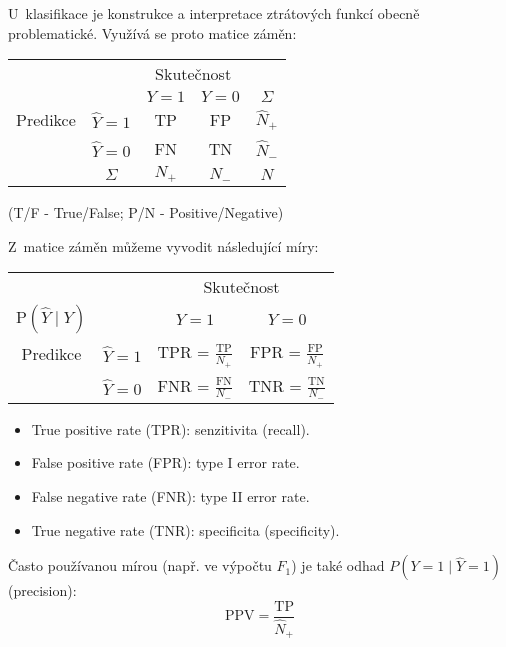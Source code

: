 U~klasifikace je konstrukce a interpretace ztrátových funkcí obecně problematické. Využívá se proto matice záměn:
{\def\arraystretch{1.5}
\begin{center}
    \begin{tabular}{ c c | c c | c }
                 &               & \multicolumn{2}{c|}{Skutečnost}                       \\
                 &               & $Y = 1$                         & $Y=0$ & $\Sigma$    \\
        \hline
        Predikce & $\hat{Y} = 1$ & TP                              & FP    & $\hat{N}_+$ \\
                 & $\hat{Y} = 0$ & FN                              & TN    & $\hat{N}_-$ \\
        \hline
                 & $\Sigma$      & $N_+$                           & $N_-$ & $N$
    \end{tabular}
\end{center}}
(T/F - True/False; P/N - Positive/Negative)

Z~matice záměn můžeme vyvodit následující míry:
{\def\arraystretch{2}
\begin{center}
    \begin{tabular}{ c c | c c }
                                   &               & \multicolumn{2}{c}{Skutečnost}                                 \\
        $\text{P}(\hat{Y} \mid Y)$ &               & $Y = 1$                        & $Y=0$                         \\
        \hline
        Predikce                   & $\hat{Y} = 1$ & TPR = $\frac{\text{TP}}{N_+}$  & FPR = $\frac{\text{FP}}{N_+}$ \\
                                   & $\hat{Y} = 0$ & FNR = $\frac{\text{FN}}{N_-}$  & TNR = $\frac{\text{TN}}{N_-}$ \\
    \end{tabular}
\end{center}}
\begin{itemize}
    \item True positive rate (TPR): senzitivita (recall).
    \item False positive rate (FPR): type I error rate.
    \item False negative rate (FNR): type II error rate.
    \item True negative rate (TNR): specificita (specificity).
\end{itemize}
Často používanou mírou (např. ve výpočtu $F_1$) je také odhad $P(Y = 1 \mid \hat{Y} = 1)$ (precision):
\[\text{PPV} = \frac{\text{TP}}{\hat{N}_+}\]

